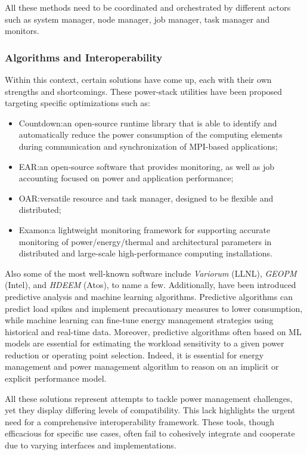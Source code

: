 All these methods need to be coordinated and orchestrated by different actors such as system manager, node manager, job manager, task manager and monitors.

\subsubsection{Algorithms and Interoperability}\label{SSEC:runtimes}

Within this context, certain solutions have come up, each with their own strengths and shortcomings. These power-stack utilities have been proposed targeting specific optimizations such as:
\begin{itemize}
    \item Countdown\cite{cesarini2019countdown}:\@ an open-source runtime library that is able to identify and automatically reduce the power consumption of the computing elements during communication and synchronization of MPI-based applications;
    \item EAR\cite{ear}:\@ an open-source software that provides monitoring, as well as job accounting focused on power and application performance;
    \item OAR\cite{oar}:\@ versatile resource and task manager, designed to be flexible and distributed;
    \item Examon\cite{Examon}:\@  a lightweight monitoring framework for supporting accurate monitoring of power/energy/thermal and architectural parameters in distributed and large-scale high-performance computing installations.
\end{itemize}

Also some of the most well-known software include \emph{Variorum} (LLNL), \emph{GEOPM} (Intel)\cite{GEOPM}, and \emph{HDEEM} (Atos)\cite{HDEEM}, to name a few.
Additionally, have been introduced predictive analysis and machine learning\cite{MLEC} algorithms. Predictive algorithms can predict load spikes and implement precautionary measures to lower consumption, while machine learning can fine-tune energy management strategies using historical and real-time data. Moreover, predictive algorithms often based on ML models are essential for estimating the workload sensitivity to a given power reduction or operating point selection. Indeed, it is essential for energy management and power management algorithm to reason on an implicit or explicit performance model.

All these solutions represent attempts to tackle power management challenges, yet they display differing levels of compatibility. This lack highlights the urgent need for a comprehensive interoperability framework. These tools, though efficacious for specific use cases, often fail to cohesively integrate and cooperate due to varying interfaces and implementations.

